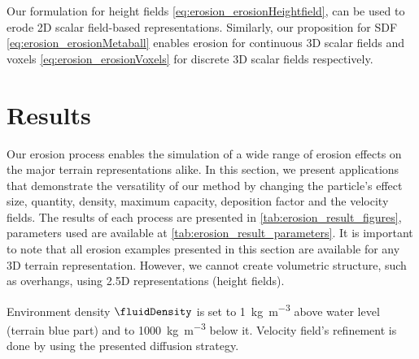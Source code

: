 Our formulation for height fields \eqref{eq:erosion_erosionHeightfield}, can be used to erode 2D scalar field-based representations. Similarly, 
our proposition for SDF \eqref{eq:erosion_erosionMetaball} enables erosion for continuous 3D scalar fields and voxels \eqref{eq:erosion_erosionVoxels} for discrete 3D scalar fields respectively.
\section{Results}
\label{sec:erosion_erosion_examples}
Our erosion process enables the simulation of a wide range of erosion effects on the major terrain representations alike. In this section, we present applications that demonstrate the versatility of our method by changing the particle's effect size, quantity, density, maximum capacity, deposition factor and the velocity fields. The results of each process are presented in \cref{tab:erosion_result_figures}, parameters used are available at \cref{tab:erosion_result_parameters}. 
It is important to note that all erosion examples presented in this section are available for any 3D terrain representation. However, we cannot create volumetric structure, such as overhangs, using 2.5D representations (height fields).

Environment density $\fluidDensity$ is set to \SI{1}{\kilogram\per\cubic\meter} above water level (terrain blue part) and to \SI{1000}{\kilogram\per\cubic\meter} below it.
Velocity field's refinement is done by using the presented diffusion strategy.

